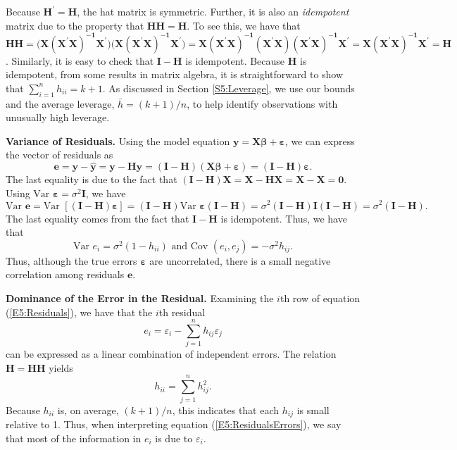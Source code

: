 Because $\mathbf{H}^{\prime}=\mathbf{H}$, the hat matrix is
symmetric. Further, it is also an \textit{idempotent} matrix due to
the property that $\mathbf{HH}=\mathbf{H}$. To see this, we have
that
$\mathbf{HH}=\mathbf{(X(\mathbf{X}^{\prime}X)}^{\mathbf{-1}}\mathbf{X}^{\prime}\mathbf{)(X(\mathbf{
X}^{\prime}X)}^{\mathbf{-1}}\mathbf{X}^{\prime}\mathbf{)}=\mathbf{X(
\mathbf{X}^{\prime}X)}^{\mathbf{-1}}\mathbf{(\mathbf{X}^{\prime}X)(\mathbf{X}^{\prime}X)}^{\mathbf{-1}}
\mathbf{X}^{\prime}=\mathbf{X(\mathbf{X}
^{\prime}X)}^{\mathbf{-1}}\mathbf{X}^{\prime}=\mathbf{H}$.
Similarly, it is easy to check that $\mathbf{I-H}$ is idempotent.
Because \textbf{H} is idempotent, from some results in matrix
algebra, it is straightforward to show that
$\sum_{i=1}^{n}h_{ii}=k+1$. As discussed in Section
\ref{S5:Leverage}, we use our bounds and the average leverage,
$\bar{h}=(k+1)/n$, to help identify observations with unusually high
leverage.

\textbf{Variance of Residuals.} Using the model equation
$\mathbf{y}=\mathbf{X} \boldsymbol \beta + \boldsymbol \varepsilon$,
we can express the vector of residuals as
\begin{equation}\label{E5:Residuals}
\mathbf{e} = \mathbf{y} - \mathbf{\hat{y}} =
\mathbf{y-Hy}=\mathbf{(I-H)(X \boldsymbol \beta +\boldsymbol
\varepsilon)}=\mathbf{(I-H) \boldsymbol \varepsilon}.
\end{equation}
The last equality is due to the fact that
$\mathbf{(I-H)X}=\mathbf{X-HX}= \mathbf{X-X}=\mathbf{0}$. Using
$\text{Var~} \boldsymbol \varepsilon = \sigma ^2 \mathbf{I}$, we
have
\begin{equation*}
\text{Var }\mathbf{e}=\text{Var }\left[ \mathbf{(I-H)\boldsymbol \varepsilon}\right] =%
\mathbf{(I-H)}\text{Var }\boldsymbol \varepsilon \mathbf{(I-H)}=\sigma ^2\mathbf{(I-H)I(I-H)}%
=\sigma ^2\mathbf{(I-H)}.
\end{equation*}
The last equality comes from the fact that $\mathbf{I-H}$ is
idempotent. Thus, we have that
\begin{equation}\label{E5:VarResiduals}
\text{Var }e_i=\sigma ^2(1-h_{ii})\text{ \ and \ Cov }%
(e_i,e_j)=-\sigma ^2h_{ij}.
\end{equation}
Thus, although the true errors $\boldsymbol \varepsilon$ are
uncorrelated, there is a small negative correlation among residuals
$\mathbf e$.

\textbf{Dominance of the Error in the Residual.} Examining the $i$th
row of equation (\ref{E5:Residuals}), we have that the $i$th
residual
\begin{equation}\label{E5:ResidualsErrors}
e_i=\varepsilon_i - \sum_{j=1}^{n} h_{ij} \varepsilon_j
\end{equation}
can be expressed as a linear combination of independent errors. The
relation $ \mathbf{H}=\mathbf{HH}$ yields
\begin{equation}\label{E5:Leverages}
h_{ii}=\sum_{j=1}^{n} h_{ij}^2.
\end{equation}
Because $h_{ii}$ is, on average, $(k+1)/n$, this indicates that each
$h_{ij}$ is small relative to 1. Thus, when interpreting equation
(\ref{E5:ResidualsErrors}), we say that most of the information in
$e_i$ is due to $\varepsilon_i$.

